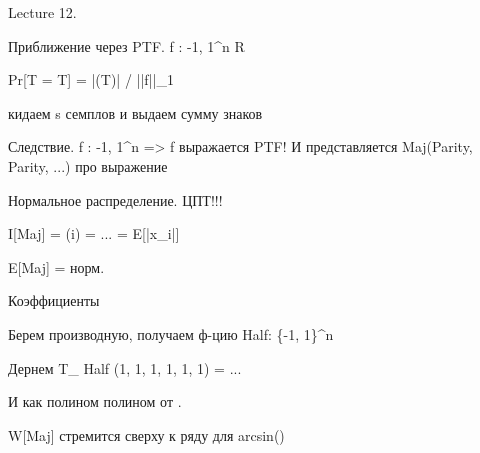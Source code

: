 Lecture 12.


Приближение через PTF. f : {-1, 1}^n \to R

Pr[T = T] = |(T)| / ||f||_1

кидаем s семплов и выдаем сумму знаков


Следствие. f : {-1, 1}^n  => f выражается PTF! И представляется Maj(Parity, \neg Parity, ...)
про выражение



Нормальное распределение. ЦПТ!!!

I[Maj] = \sum {}(i) = ... = E[|\sum x_i|]

E[Maj] = \int норм.




Коэффициенты

Берем производную, получаем ф-цию Half: \{-1, 1\}^n 

Дернем T_{\rho} Half (1, 1, 1, 1, 1, 1) = ...

И как полином полином от \rho.




W[Maj] стремится сверху к ряду для arcsin(\rho)